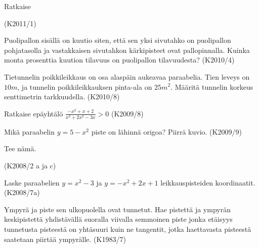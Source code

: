 \begin{tehtava} Ratkaise
  \begin{alakohdat}
  \end{alakohdat}
	(K2011/1)
\end{tehtava}

\begin{tehtava}
Puolipallon sisällä on kuutio siten, että sen yksi sivutahko on puolipallon pohjatasolla ja vastakkaisen sivutahkon kärkipisteet ovat pallopinnalla. Kuinka monta prosenttia kuution tilavuus on puolipallon tilavuudesta?
(K2010/4)
\end{tehtava}

\begin{tehtava}
Tietunnelin poikkileikkaus on osa alaspäin aukeavaa paraabelia. Tien leveys on $10 m$, ja tunnelin poikkileikkauksen pinta-ala on $25 m^2$. Määritä tunnelin korkeus senttimetrin tarkkuudella.
(K2010/8)
\end{tehtava}

\begin{tehtava}
Ratkaise epäyhtälö
$\frac{-x^2+x+2}{x^3+2x^2-3x}>0$
(K2009/8)
\end{tehtava}

\begin{tehtava}
Mikä paraabelin $y=5-x^2$ piste on lähinnä origoa? Piirrä kuvio.
(K2009/9)
\end{tehtava}



\begin{tehtava} Tee nämä.
  \begin{alakohdat}
  \end{alakohdat}
	(K2008/2 a ja c)
\end{tehtava}


\begin{tehtava}
Laske paraabelien $y=x^2-3$ ja $y=-x^2+2x+1$ leikkauspisteiden koordinaatit.(K2008/7a)
\end{tehtava}

\begin{tehtava}
Ympyrä ja piste sen ulkopuolella ovat tunnetut. Hae pistettä ja ympyrän keskipistettä yhdistävällä suoralla viivalla semmoinen piste jonka etäisyys tunnetusta pisteestä on yhtäsuuri kuin ne tangentit, jotka haettavasta pisteestä saatetaan piirtää ympyrälle. (K1983/7)
\end{tehtava}

